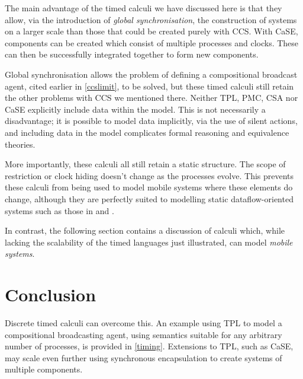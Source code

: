 The main advantage of the timed calculi we have discussed here is that
they allow, via the introduction of \emph{global synchronisation}, the
construction of systems on a larger scale than those that could be
created purely with CCS.  With CaSE, components can be created which
consist of multiple processes and clocks.  These can then be
successfully integrated together to form new components.

Global synchronisation allows the problem of defining a compositional
broadcast agent, cited earlier in \ref{ccslimit}, to be solved, but
these timed calculi still retain the other problems with CCS we
mentioned there.  Neither TPL, PMC, CSA nor CaSE explicitly include
data within the model.  This is not necessarily a disadvantage; it is
possible to model data implicitly, via the use of silent actions, and
including data in the model complicates formal reasoning and
equivalence theories.

More importantly, these calculi all still retain a static structure.
The scope of restriction or clock hiding doesn't change as the
processes evolve.  This prevents these calculi from being used to
model mobile systems where these elements do change, although they
are perfectly suited to modelling static dataflow-oriented systems
such as those in \cite{WICSA} and \cite{cashews-sem}.

In contrast, the following section contains a discussion of calculi
which, while lacking the scalability of the timed languages just
illustrated, can model \emph{mobile systems}.

\section{Conclusion}

Discrete timed calculi can overcome this.  An example using TPL to
model a compositional broadcasting agent, using semantics suitable for
any arbitrary number of processes, is provided in \ref{timing}.
Extensions to TPL, such as CaSE, may scale even further using
synchronous encapsulation to create systems of multiple components.
